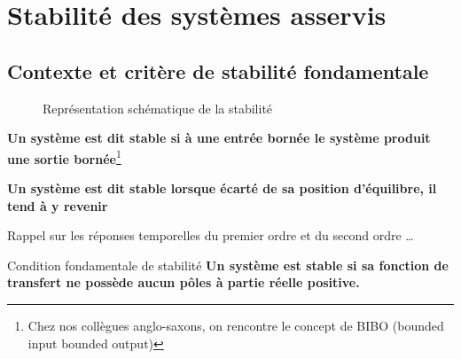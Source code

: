 \chapter{Stabilité des systèmes asservis\label{chap-stab}}
\minitoc
\newpage
\section{Contexte et critère de stabilité fondamentale}
\begin{figure}[!h]
    \centering
    
    \caption{Représentation schématique de la stabilité}
\end{figure}

\textbf{Un système est dit stable si à une entrée bornée le système produit 
une sortie bornée}\footnote{Chez nos collègues anglo-saxons, on rencontre le 
concept de BIBO (\og bounded input bounded output\fg)}

\textbf{Un système est dit stable lorsque écarté de sa position d'équilibre, il 
tend à y revenir}

Rappel sur les réponses temporelles du premier ordre et du second ordre \ldots
\acpl

\begin{criteria}{Condition fondamentale de stabilité}
    \textbf{Un système est stable si sa fonction de transfert ne possède aucun 
            pôles à partie réelle positive.}
\end{criteria}

